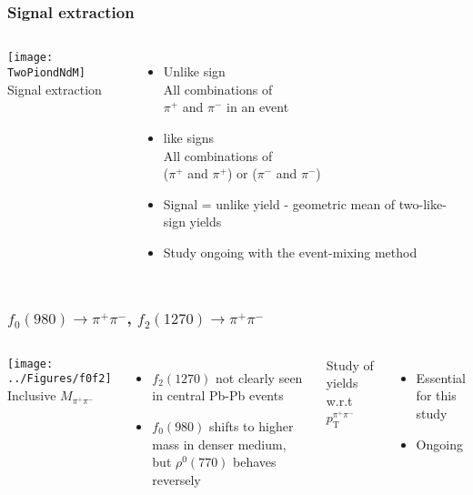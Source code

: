 \begin{frame}
\frametitle{Signal extraction}
\begin{columns}[c]
\texttt{[image: TwoPiondNdM]}\\
Signal extraction
\begin{itemize}
\item{Unlike sign\\All combinations of \\ $\pi^{+}$ and $\pi^{-}$ in an event }
\item{like signs\\All combinations of\\ ($\pi^{+}$ and $\pi^{+}$)  or ($\pi^{-}$ and $\pi^{-}$) }
\item{Signal = unlike yield - geometric mean of two-like-sign yields}
\item{Study ongoing with the event-mixing method }

\end{itemize}
\end{columns}

\end{frame}

\begin{frame}
\frametitle{$f_0(980) \rightarrow \pi^{+}\pi^{-}$, $f_2(1270) \rightarrow \pi^{+}\pi^{-}$}
\begin{columns}[c]
\texttt{[image: ../Figures/f0f2]}\\
Inclusive $M_{\pi^{+}\pi^{-}}$  
\begin{itemize}
	\item{$f_2(1270)$ not clearly seen in central Pb-Pb events}
	\item{$f_0(980)$ shifts to higher mass in denser medium, but $\rho^0(770)$ behaves reversely   }
\end{itemize}
Study of yields w.r.t $p_\mathrm{T}^{\pi^{+}\pi^{-}}$ 
\begin{itemize}
\item{Essential for this study}
\item{Ongoing}
\end{itemize}

\end{columns}
\end{frame}





















